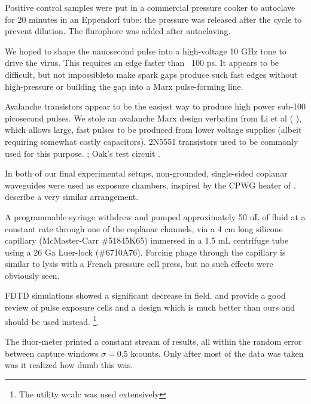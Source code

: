 \documentclass[paper.tex]{subfiles}
\begin{document}
\begin{multicols}{1}
Positive control samples were put in a commercial pressure cooker to autoclave for 20 minutes in an Eppendorf tube: the pressure was released after the cycle to prevent dilution. The flurophore was added after autoclaving.

We hoped to shape the nanosecond pulse into a high-voltage 10 GHz tone to drive the virus. This requires an edge faster than ~100 ps. It appears to be difficult, but not impossible\cite{Fundamental1998}to make spark gaps produce such fast edges without high-pressure\cite{kHz1995} \cite{Design2007d}\cite{Picosecond1993} or building the gap into a Marx\cite{Simple1991} pulse-forming line. 

Avalanche transistors appear to be the easiest way to produce high power sub-100 picosecond pulses. We stole an avalanche Marx design verbatim from Li et al (\cite{Development2016b} \cite{Design2018c}), which allows large, fast pulses to be produced from lower voltage supplies (albeit requiring somewhat costly capacitors). 2N5551 transistors used to be commonly used for this purpose. \cite{Avalanche1991}\cite{high1994}\cite{High1998}; Oak's test circuit .

In both of our final experimental setups, non-grounded, single-sided coplanar waveguides were used as exposure chambers, inspired by the CPWG heater of \cite{Microwave2007}. \cite{Nanosecond2006} describe a very similar arrangement. 

A programmable syringe withdrew and pumped approximately 50 uL of fluid at a constant rate through one of the coplanar channels, via a 4 cm long silicone capillary (McMaster-Carr \#51845K65) immersed in a 1.5 mL centrifuge tube using a 26 Ga Luer-lock (\#6710A76). Forcing phage through the capillary is similar to lysis with a French pressure cell press, but no such effects were obviously seen.

FDTD simulations showed a significant decrease in field. \cite{Microchamber2011} and \cite{Characterization2012} provide a good review of pulse exposure cells and a design which is much better than ours and should be used instead. \cite{Electromagnetic1989} \footnote{The utility wcalc was used extensively}.


%


The fluor-meter printed a constant stream of results, all within the random error between capture windows $\sigma=0.5$ kcounts. Only after most of the data was taken was it realized how dumb this was.



\end{multicols}
\end{document}
